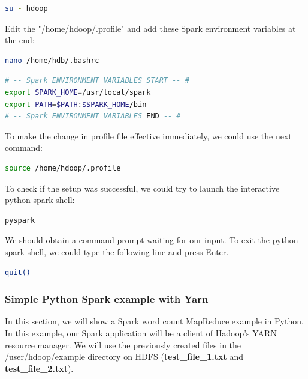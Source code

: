 \documentclass[12pt,english]{book}
\begin{document}
\begin{lstlisting}[language=bash, frame=single, basicstyle=\footnotesize]
su - hdoop
\end{lstlisting}

Edit the "/home/hdoop/.profile" and add these Spark environment variables at the end:

\begin{lstlisting}[language=bash, frame=single, basicstyle=\footnotesize]
nano /home/hdb/.bashrc
\end{lstlisting}
\begin{lstlisting}[language=bash, frame=single, basicstyle=\footnotesize]
# -- Spark ENVIRONMENT VARIABLES START -- #
export SPARK_HOME=/usr/local/spark
export PATH=$PATH:$SPARK_HOME/bin
# -- Spark ENVIRONMENT VARIABLES END -- #
\end{lstlisting}

To make the change in profile file effective immediately, we could use the next command:

\begin{lstlisting}[language=bash, frame=single, basicstyle=\footnotesize]
source /home/hdoop/.profile
\end{lstlisting}

To check if the setup was successful, we could try to launch the interactive python spark-shell:

\begin{lstlisting}[language=bash, frame=single, basicstyle=\footnotesize]
pyspark
\end{lstlisting}

We should obtain a command prompt waiting for our input. To exit the python spark-shell, we could type the following line and press Enter.

\begin{lstlisting}[language=bash, frame=single, basicstyle=\footnotesize]
quit()
\end{lstlisting}

\subsubsection{Simple Python Spark example with Yarn}

In this section, we will show a Spark word count MapReduce example in Python.
In this example, our Spark application will be a client of Hadoop's YARN resource manager.
We will use the previously created files in the /user/hdoop/example directory on HDFS (\textbf{test\_file\_1.txt} and \textbf{test\_file\_2.txt}).
\end{document}
